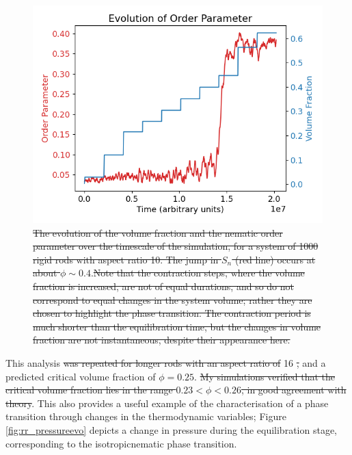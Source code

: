 \documentclass[11pt, a4paper]{article} %
\providecommand{\DIFadd}[1]{{\protect\color{blue}\uwave{#1}}} %
\providecommand{\DIFdel}[1]{{\protect\color{red}\sout{#1}}}                      %
\providecommand{\DIFaddbegin}{} %
\providecommand{\DIFaddend}{} %
\providecommand{\DIFdelbegin}{} %
\providecommand{\DIFdelend}{} %
\providecommand{\DIFaddFL}[1]{\DIFadd{#1}} %
\providecommand{\DIFdelFL}[1]{\DIFdel{#1}} %
\providecommand{\DIFaddbeginFL}{} %
\providecommand{\DIFaddendFL}{} %
\providecommand{\DIFdelbeginFL}{} %
\providecommand{\DIFdelendFL}{} %
\begin{document}
\begin{figure} [h!]
	\centering
	\includegraphics[width=0.7\linewidth]{Figures/rigidrod_nemorderparam}
	\caption{\DIFdelbeginFL \DIFdelFL{The evolution of the volume fraction and the nematic order parameter over the timescale of the simulation, for a system of 1000 rigid rods with aspect ratio 10. The jump in $S_n$ (red line) occurs at about $\phi \sim 0.4$}\DIFdelendFL \DIFaddbeginFL \DIFaddFL{\textcolor{forestgreen}{The evolution of the volume fraction and the nematic order parameter over the timescale of the simulation, for a system of 1000 rigid rods with aspect ratio 10. The jump in $S_n$ (red line) occurs at about $\phi \sim 0.4$. Note that the contraction steps, where the volume fraction is increased, are not of equal durations, and so do not correspond to equal changes in the system volume; rather they are chosen to highlight the phase transition. The contraction period is much shorter than the equilibration time, but the changes in volume fraction are not instantaneous, despite their appearance here}}\DIFaddendFL .\DIFdelbeginFL \DIFdelFL{Note that the contraction steps, where the volume fraction is increased, are not of equal durations, and so do not correspond to equal changes in the system volume; rather they are chosen to highlight the phase transition. The contraction period is much shorter than the equilibration time, but the changes in volume fraction are not instantaneous, despite their appearance here.}\DIFdelendFL }
	\label{fig:rr_nemorderparam}
\end{figure}  %

This analysis \DIFdelbegin \DIFdel{was repeated for longer rods with an aspect ratio of }\DIFdelend \DIFaddbegin \DIFadd{\textcolor{forestgreen}{was repeated for longer rods with an aspect ratio of} }\DIFaddend \num{16} \DIFdelbegin \DIFdel{, }\DIFdelend and a predicted critical volume fraction of $\phi  = 0.25$. \DIFdelbegin \DIFdel{My simulations verified that the critical volume fraction lies in the range $0.23 < \phi< 0.26$, in good agreement with theory}\DIFdelend \DIFaddbegin \DIFadd{\textcolor{forestgreen}{My simulations verified that the critical volume fraction lies in the range $0.23 < \phi< 0.26$, in good agreement with theory}}\DIFaddend . This also provides a useful example of the characterisation of a phase transition through changes in the thermodynamic variables; Figure \ref{fig:rr_pressureevo} depicts a change in pressure during the equilibration stage, corresponding to the isotropic\textendash nematic phase transition.
\end{document}
